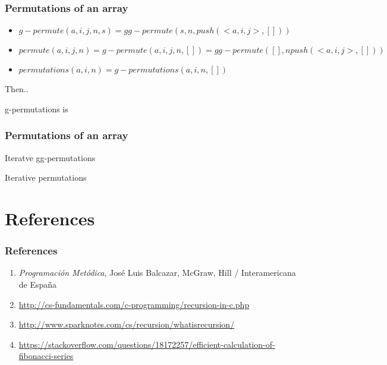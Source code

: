 \documentclass{beamer}
\begin{document}
\begin{frame}
	\frametitle{Permutations of an array}
	\begin{itemize}
		\item $g-permute(a,i,j,n,s) = gg-permute(s,n,push(<a,i,j>,[]))$
		\item $permute(a,i,j,n) = g-permute(a,i,j,n,[]) = gg-permute([],n push(<a,i,j>,[]))$
		\item $permutations(a,i,n) = g-permutations(a,i,n,[])$
	\end{itemize}
	Then..
	\begin{block}{g-permutations is}
		\tiny
		\begin{algorithmic}[1]
					\State {}
				\Else
					\State {}
				\EndIf
			\EndProcedure
		\end{algorithmic}
	\end{block}
\end{frame}
\begin{frame}
	\frametitle{Permutations of an array}
	\begin{block}{Iteratve gg-permutations}
		\tiny
		\begin{algorithmic}[1]
					\State {}
				\Else
					\State {}
				\EndIf
			\EndProcedure
		\end{algorithmic}
	\end{block}
	\begin{block}{Iterative permutations}
		\tiny
		\begin{algorithmic}[1]
				\State {}
			\EndProcedure
		\end{algorithmic}
	\end{block}
\end{frame}
\section{References}

\begin{frame}
	\frametitle{References}

	\begin{enumerate}
		\item \textit{Programaci\'on Met\'odica}, Jos\'e Luis Balcazar, McGraw, Hill / Interamericana de Espa\~na 
		\item \url{http://cs-fundamentals.com/c-programming/recursion-in-c.php}
		\item \url{http://www.sparknotes.com/cs/recursion/whatisrecursion/}
		\item \url{https://stackoverflow.com/questions/18172257/efficient-calculation-of-fibonacci-series}
	\end{enumerate}
\end{frame}
\end{document}
